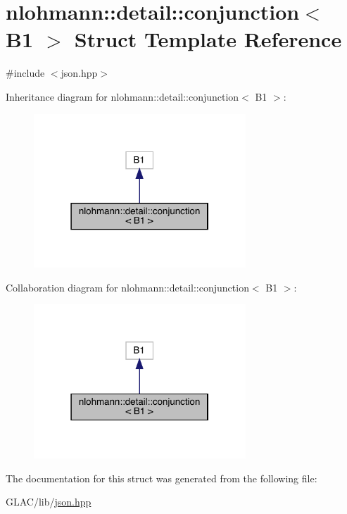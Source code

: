 \hypertarget{structnlohmann_1_1detail_1_1conjunction_3_01_b1_01_4}{}\section{nlohmann\+::detail\+::conjunction$<$ B1 $>$ Struct Template Reference}
\label{structnlohmann_1_1detail_1_1conjunction_3_01_b1_01_4}


{\ttfamily \#include $<$json.\+hpp$>$}



Inheritance diagram for nlohmann\+::detail\+::conjunction$<$ B1 $>$\+:
\nopagebreak
\begin{figure}[H]
\begin{center}
\leavevmode
\includegraphics[width=226pt]{structnlohmann_1_1detail_1_1conjunction_3_01_b1_01_4__inherit__graph}
\end{center}
\end{figure}


Collaboration diagram for nlohmann\+::detail\+::conjunction$<$ B1 $>$\+:
\nopagebreak
\begin{figure}[H]
\begin{center}
\leavevmode
\includegraphics[width=226pt]{structnlohmann_1_1detail_1_1conjunction_3_01_b1_01_4__coll__graph}
\end{center}
\end{figure}


The documentation for this struct was generated from the following file\+:\begin{DoxyCompactItemize}
\item 
G\+L\+A\+C/lib/\mbox{\hyperlink{json_8hpp}{json.\+hpp}}\end{DoxyCompactItemize}

